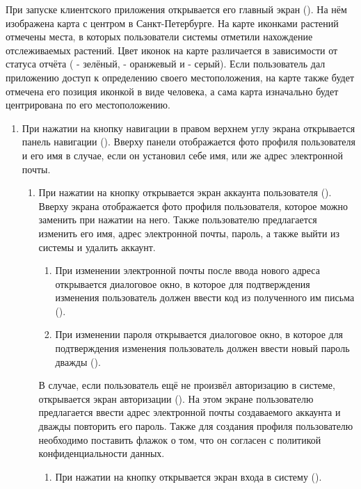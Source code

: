 \tab
При запуске клиентского приложения открывается его главный экран ().
На нём изображена карта с центром в Санкт-Петербурге.
На карте иконками растений отмечены места, в которых пользователи системы отметили нахождение отслеживаемых растений.
Цвет иконок на карте различается в зависимости от статуса отчёта ( - зелёный,  - оранжевый и  - серый).
Если пользователь дал приложению доступ к определению своего местоположения, на карте также будет отмечена его позиция иконкой в виде человека, а сама карта изначально будет центрирована по его местоположению.
\begin{enumerate}
	\item При нажатии на кнопку навигации в правом верхнем углу экрана открывается панель навигации ().
	Вверху панели отображается фото профиля пользователя и его имя в случае, если он установил себе имя, или же адрес электронной почты.
	\begin{enumerate}
		\item При нажатии на кнопку  открывается экран аккаунта пользователя ().
		Вверху экрана отображается фото профиля пользователя, которое можно заменить при нажатии на него.
		Также пользователю предлагается изменить его имя, адрес электронной почты, пароль, а также выйти из системы и удалить аккаунт.
		\begin{enumerate}
			\item При изменении электронной почты после ввода нового адреса открывается диалоговое окно, в которое для подтверждения изменения пользователь должен ввести код из полученного им письма ().
			\item При изменении пароля открывается диалоговое окно, в которое для подтверждения изменения пользователь должен ввести новый пароль дважды ().
		\end{enumerate}
		В случае, если пользователь ещё не произвёл авторизацию в системе, открывается экран авторизации ().
		На этом экране пользователю предлагается ввести адрес электронной почты создаваемого аккаунта и дважды повторить его пароль.
		Также для создания профиля пользователю необходимо поставить флажок о том, что он согласен с политикой конфиденциальности данных.
		\begin{enumerate}
			\item При нажатии на кнопку  открывается экран входа в систему ().

\end{enumerate}
\end{enumerate}
\end{enumerate}
